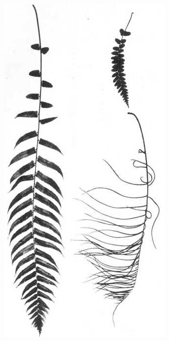 \begin{figure}[t]
	\centering
	\begin{minipage}[t]{0.9\textwidth}
		\begin{minipage}[t]{(\textwidth-\fgap) * \real{0.424}}
			\centering
			\includegraphics[width=\textwidth]{graphics/fig_027}

\end{minipage}
\end{minipage}
\end{figure}

